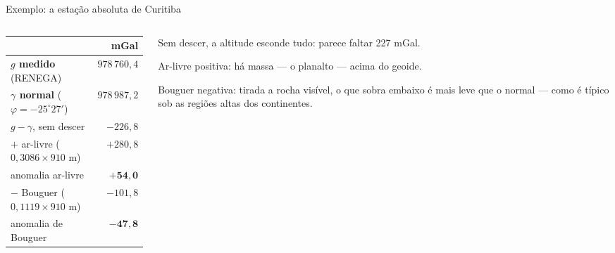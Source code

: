 \documentclass[aspectratio=169,11pt]{beamer}
\newcommand{\sist}[1]{\textcolor{corIdeal}{\textbf{#1}}}
\newcommand{\fram}[1]{\textcolor{corMedido}{\textbf{#1}}}
\begin{document}
\begin{frame}{Exemplo: a estação absoluta de Curitiba}
  \begin{columns}[T]
    \begin{column}{0.54\textwidth}
      \centering
      \small
      \renewcommand{\arraystretch}{1.3}
      \begin{tabular}{lr}
        \toprule
        & mGal \\
        \midrule
        \fram{$g$ medido} (RENEGA) & $978\,760{,}4$ \\
        \sist{$\gamma$ normal} ($\varphi = -25^{\circ}27'$) & $978\,987{,}2$ \\
        $g - \gamma$, sem descer & \alert{$-226{,}8$} \\
        \midrule
        $+$ ar-livre ($0{,}3086 \times 910$ m) & $+280{,}8$ \\
        anomalia ar-livre & \textcolor{mRose}{$\mathbf{+54{,}0}$} \\
        $-$ Bouguer ($0{,}1119 \times 910$ m) & $-101{,}8$ \\
        anomalia de Bouguer & \textcolor{mRose}{$\mathbf{-47{,}8}$} \\
        \bottomrule
      \end{tabular}
    \end{column}
    \begin{column}{0.42\textwidth}
      \begin{ideia}[title={Lendo os números}]
        \small Sem descer, a altitude esconde tudo: parece faltar 227 mGal.
        \medskip

        Ar-livre positiva: há massa --- o planalto --- acima do geoide.
        \medskip

        Bouguer negativa: tirada a rocha visível, o que sobra embaixo é \alert{mais leve}
        que o normal --- como é típico sob as regiões altas dos continentes.
      \end{ideia}
    \end{column}
  \end{columns}
\end{frame}
\end{document}
